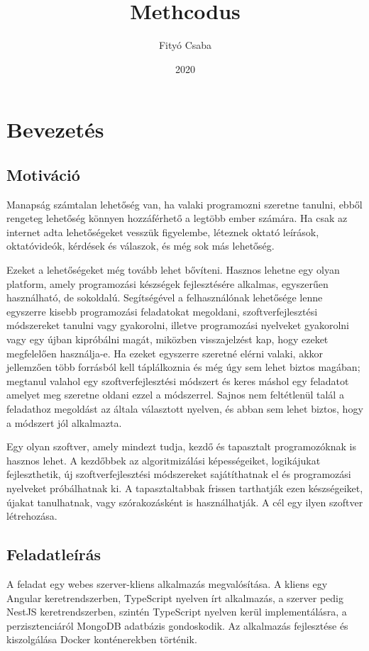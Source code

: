 \documentclass{elteikthesis}
\title{Methcodus}
\date{2020}
\author{Fityó Csaba}
\affiliation{mesteroktató}
\begin{document}

	\maketitle

	\tableofcontents

	\chapter{Bevezetés}

		\section{Motiváció}
			Manapság számtalan lehetőség van, ha valaki programozni szeretne tanulni, ebből rengeteg lehetőség könnyen hozzáférhető a legtöbb ember számára. Ha csak az internet adta lehetőségeket vesszük figyelembe, léteznek oktató leírások, oktatóvideók, kérdések és válaszok, és még sok más lehetőség.

			Ezeket a lehetőségeket még tovább lehet bővíteni. Hasznos lehetne egy olyan platform, amely programozási készségek fejlesztésére alkalmas, egyszerűen használható, de sokoldalú. Segítségével a felhasználónak lehetősége lenne egyszerre kisebb programozási feladatokat megoldani, szoftverfejlesztési módszereket tanulni vagy gyakorolni, illetve programozási nyelveket gyakorolni vagy egy újban kipróbálni magát, miközben visszajelzést kap, hogy ezeket megfelelően használja-e. Ha ezeket egyszerre szeretné elérni valaki, akkor jellemzően több forrásból kell táplálkoznia és még úgy sem lehet biztos magában; megtanul valahol egy szoftverfejlesztési módszert és keres máshol egy feladatot amelyet meg szeretne oldani ezzel a módszerrel. Sajnos nem feltétlenül talál a feladathoz megoldást az általa választott nyelven, és abban sem lehet biztos, hogy a módszert jól alkalmazta.
			
			Egy olyan szoftver, amely mindezt tudja, kezdő és tapasztalt programozóknak is hasznos lehet. A kezdőbbek az algoritmizálási képességeiket, logikájukat fejleszthetik, új szoftverfejlesztési módszereket sajátíthatnak el és programozási nyelveket próbálhatnak ki. A tapasztaltabbak frissen tarthatják ezen készségeiket, újakat tanulhatnak, vagy szórakozásként is használhatják. A cél egy ilyen szoftver létrehozása.

		\section{Feladatleírás}
			A feladat egy webes szerver-kliens alkalmazás megvalósítása. A kliens egy Angular keretrendszerben, TypeScript nyelven írt alkalmazás, a szerver pedig NestJS keretrendszerben, szintén TypeScript nyelven kerül implementálásra, a perzisztenciáról MongoDB adatbázis gondoskodik. Az alkalmazás fejlesztése és kiszolgálása Docker konténerekben történik.
\end{document}
